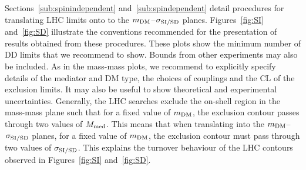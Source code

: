 Sections~\ref{sub:spinindependent} and~\ref{sub:spindependent} detail procedures for translating  LHC limits onto to the  $m_{\rm{DM}}$--$\hspace{0.25mm} \sigma_{\rm{SI/SD}}$ planes.  Figures~\ref{fig:SI} and~\ref{fig:SD} illustrate the conventions recommended for the presentation of results obtained from these procedures. These plots show the minimum number of DD limits that we recommend to show. Bounds from other experiments may also be included. As in the mass-mass plots, we recommend to explicitly specify details of the mediator and DM type, the choices of couplings and the CL of the exclusion limits. It may also be useful to show theoretical and experimental uncertainties. Generally, the  LHC  searches exclude the on-shell region in the mass-mass plane such that for a fixed value of $m_{\rm{DM}}$, the exclusion contour passes through two values of $M_{\rm{med}}$. This means that when translating into the   $m_{\rm{DM}}$--$\hspace{0.25mm} \sigma_{\rm{SI/SD}}$ planes, for a fixed value of $m_{\rm{DM}}$, the exclusion contour must pass through two values of $\sigma_{\rm{SI/SD}}$. This explains the turnover behaviour   of the  LHC contours observed in Figures~\ref{fig:SI} and~\ref{fig:SD}.


